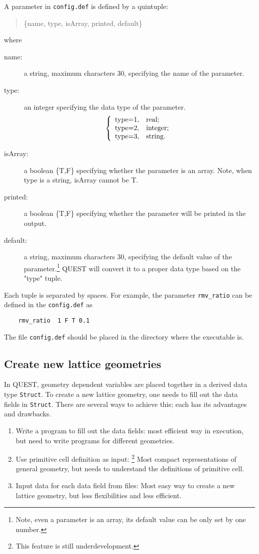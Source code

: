 \documentclass[12pt]{article}
\begin{document}
A parameter in \verb"config.def" is defined by a quintuple:
\begin{quote}
    \{name, type, isArray, printed, default\}
\end{quote}
where
\begin{description}
  \item[name:] a string, maximum characters 30, specifying the name of the parameter.
  \item[type:] an integer specifying the data type of the parameter.
  $$
  \left\{
    \begin{array}{ll}
      \hbox{type=1}, & \hbox{real;} \\
      \hbox{type=2}, & \hbox{integer;} \\
      \hbox{type=3}, & \hbox{string.}
    \end{array}
  \right.
  $$
  \item[isArray:] a boolean \{T,F\} specifying whether the parameter is an array.
  Note, when type is a string, isArray cannot be T.
  \item[printed:] a boolean \{T,F\} specifying whether the parameter will be printed in the output.
  \item[default:] a string, maximum characters 30,  specifying the default value of the parameter.\footnote{Note, even a parameter is an array, its default value can be only set by one number.}  QUEST will convert it to a proper data type based on the "type" tuple.
\end{description}
Each tuple is separated by spaces.
For example, the parameter \verb"rmv_ratio" can be defined in the \verb"config.def" as
\begin{verbatim}
    rmv_ratio  1 F T 0.1
\end{verbatim}

The file \verb"config.def" should be placed in the directory where the executable is.

\subsection{Create new lattice geometries}
In QUEST, geometry dependent variables are placed together in a derived data type \verb"Struct". To create a new lattice geometry, one needs to fill out the data fields in \verb"Struct". There are several ways to achieve this; each has its advantages and drawbacks.
\begin{enumerate}
  \item Write a program to fill out the data fields: most efficient way in execution, but need to write programs for different geometries.
  \item Use primitive cell definition as input: \footnote{This feature is still underdevelopment.} Most compact representations of general geometry, but needs to understand the definitions of primitive cell.
  \item Input data for each data field from files: Most easy way to create a new lattice geometry, but less flexibilities and less efficient.
\end{enumerate}
\end{document}

